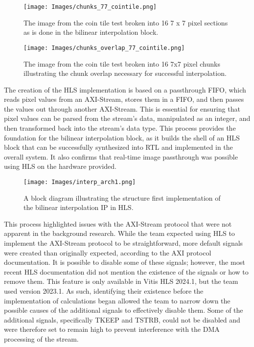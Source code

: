 \documentclass{article}
\begin{document}
                \begin{figure}[!tb] 
                    \centering
                    \texttt{[image: Images/chunks\_77\_cointile.png]} 
                    \caption{The image from the coin tile test broken into 16 7 x 7 pixel sections as is done in the bilinear interpolation block.}
                    \label{fig:77sections} 
                \end{figure}
                \begin{figure}[!tb] 
                    \centering
                    \texttt{[image: Images/chunks\_overlap\_77\_cointile.png]} 
                    \caption{The image from the coin tile test broken into 16 7x7 pixel chunks illustrating the chunk overlap necessary for successful interpolation. }
                    \label{fig:77sections_overlap} 
                \end{figure}
                \par The creation of the HLS implementation is based on a passthrough FIFO, which reads pixel values from an AXI-Stream, stores them in a FIFO, and then passes the values out through another AXI-Stream. This is essential for ensuring that pixel values can be parsed from the stream’s data, manipulated as an integer, and then transformed back into the stream's data type. This process provides the foundation for the bilinear interpolation block, as it builds the shell of an HLS block that can be successfully synthesized into RTL and implemented in the overall system. It also confirms that real-time image passthrough was possible using HLS on the hardware provided. 

                \begin{figure}[!tb] 
                    \centering
                    \texttt{[image: Images/interp\_arch1.png]} 
                    \caption{A block diagram illustrating the structure first implementation of the bilinear interpolation IP in HLS.}
                    \label{fig:interp_arch_v1} 
                \end{figure}

                \par This process highlighted issues with the AXI-Stream protocol that were not apparent in the background research. While the team expected using HLS to implement the AXI-Stream protocol to be straightforward, more default signals were created than originally expected, according to the AXI protocol documentation. It is possible to disable some of these signals; however, the most recent HLS documentation did not mention the existence of the signals or how to remove them. This feature is only available in Vitis HLS 2024.1, but the team used version 2023.1. As such, identifying their existence before the implementation of calculations began allowed the team to narrow down the possible causes of the additional signals to effectively disable them. Some of the additional signals, specifically TKEEP and TSTRB, could not be disabled and were therefore set to remain high to prevent interference with the DMA processing of the stream.
\end{document}
